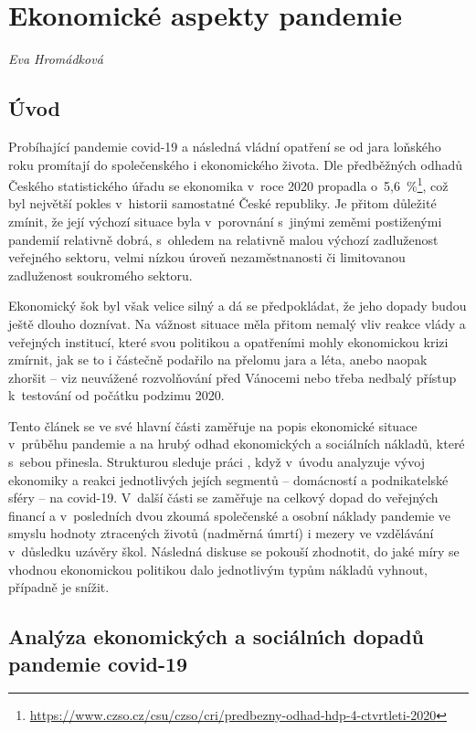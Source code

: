 
\chapter{Ekonomick\'{e} aspekty pandemie} \label{Ekonomicke_aspekty}

\textit{Eva Hromádková}
\vspace{15mm}

\section*{\'{U}vod} 
Probíhající pandemie covid-19 a následná vládní opatření se od jara loňského roku promítají do společenského i ekonomického života. Dle předběžných odhadů Českého statistického úřadu se ekonomika v~roce 2020 propadla o~5,6~\%\footnote{\url{https://www.czso.cz/csu/czso/cri/predbezny-odhad-hdp-4-ctvrtleti-2020}}, což byl největší pokles v~historii samostatné České republiky. Je přitom důležité zmínit, že její výchozí situace byla v~porovnání s~jinými zeměmi postiženými pandemií relativně dobrá, s~ohledem na relativně malou výchozí zadluženost veřejného sektoru, velmi nízkou úroveň nezaměstnanosti či limitovanou zadluženost soukromého sektoru. 

Ekonomický šok byl však velice silný a dá se předpokládat, že jeho dopady budou ještě dlouho doznívat. Na vážnost situace měla přitom nemalý vliv reakce vlády a veřejných institucí, které svou politikou a opatřeními mohly ekonomickou krizi zmírnit, jak se to i částečně podařilo na přelomu jara a léta, anebo naopak zhoršit -- viz neuvážené rozvolňování před Vánocemi nebo třeba nedbalý přístup k~testování od počátku podzimu 2020.

Tento článek se ve své hlavní části zaměřuje na popis ekonomické situace v~průběhu pandemie a na hrubý odhad ekonomických a sociálních nákladů, které s~sebou přinesla. Strukturou sleduje práci \cite{Levy2021}, když v~úvodu analyzuje vývoj ekonomiky a reakci jednotlivých jejích segmentů – domácností a podnikatelské sféry – na covid-19. V~další části se zaměřuje na celkový dopad do veřejných financí a v~posledních dvou zkoumá společenské a osobní náklady pandemie ve smyslu hodnoty ztracených životů (nadměrná úmrtí) i mezery ve vzdělávání v~důsledku uzávěry škol. Následná diskuse se pokouší zhodnotit, do jaké míry se vhodnou ekonomickou politikou dalo jednotlivým typům nákladů vyhnout, případně je snížit.

\section*{Anal\'{y}za ekonomick\'{y}ch a soci\'{a}ln\'{\i}ch dopad\r{u} pandemie covid-19} 

